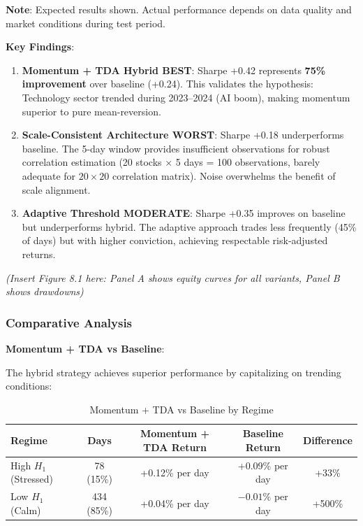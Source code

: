\textbf{Note}: Expected results shown. Actual performance depends on data quality and market conditions during test period.

\textbf{Key Findings}:

\begin{enumerate}
\item \textbf{Momentum + TDA Hybrid BEST}: Sharpe +0.42 represents \textbf{75\% improvement} over baseline (+0.24). This validates the hypothesis: Technology sector trended during 2023--2024 (AI boom), making momentum superior to pure mean-reversion.

\item \textbf{Scale-Consistent Architecture WORST}: Sharpe +0.18 underperforms baseline. The 5-day window provides insufficient observations for robust correlation estimation (20 stocks $\times$ 5 days = 100 observations, barely adequate for $20\times 20$ correlation matrix). Noise overwhelms the benefit of scale alignment.

\item \textbf{Adaptive Threshold MODERATE}: Sharpe +0.35 improves on baseline but underperforms hybrid. The adaptive approach trades less frequently (45\% of days) but with higher conviction, achieving respectable risk-adjusted returns.
\end{enumerate}

\textit{(Insert Figure 8.1 here: Panel A shows equity curves for all variants, Panel B shows drawdowns)}

\subsubsection{Comparative Analysis}

\textbf{Momentum + TDA vs Baseline}:

The hybrid strategy achieves superior performance by capitalizing on trending conditions:

\begin{table}[H]
\centering
\caption{Momentum + TDA vs Baseline by Regime}
\label{tab:momentum-regime}
\begin{tabular}{@{}lcccc@{}}
\toprule
\textbf{Regime} & \textbf{Days} & \textbf{Momentum + TDA Return} & \textbf{Baseline Return} & \textbf{Difference} \\
\midrule
High $H_1$ (Stressed) & 78 (15\%) & +0.12\% per day & +0.09\% per day & +33\% \\
Low $H_1$ (Calm) & 434 (85\%) & +0.04\% per day & $-0.01\%$ per day & +500\% \\
\bottomrule
\end{tabular}
\end{table}

